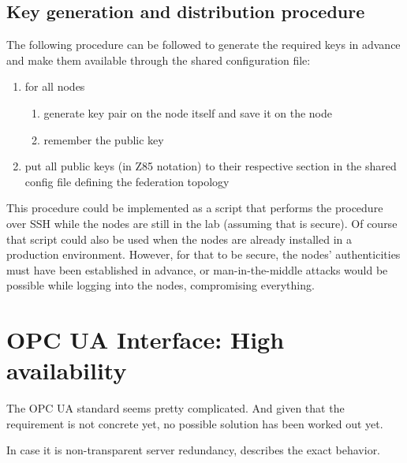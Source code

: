 \subsection{Key generation and distribution procedure}
The following procedure can be followed to generate the required keys in
advance and make them available through the shared configuration file:

\begin{enumerate}
	\item for all nodes
	\begin{enumerate}
		\item generate key pair on the node itself and save it on the
			node
		\item remember the public key
	\end{enumerate}

	\item put all public keys (in Z85 notation) to their respective section
		in the shared config file defining the federation topology
\end{enumerate}

This procedure could be implemented as a script that performs the procedure
over \gls{SSH} while the nodes are still in the
lab (assuming that is secure). Of course that script could also be used when
the nodes are already installed in a production environment. However, for that to be
secure, the nodes' authenticities must have been established in advance, or
man-in-the-middle attacks would be possible while logging into the nodes,
compromising everything.



% 
% 
% 

\section{OPC UA Interface: High availability}\label{sec:approach:opc-ua}
The OPC UA standard seems pretty complicated. And given that the requirement
is not concrete yet, no possible solution has been worked out yet.

In case it is non-transparent server redundancy, \cite[6.4.2.4 Non-transparent
Redundancy, p.~96]{opc-ua:behavior:server-redundancy} describes the exact
behavior.

